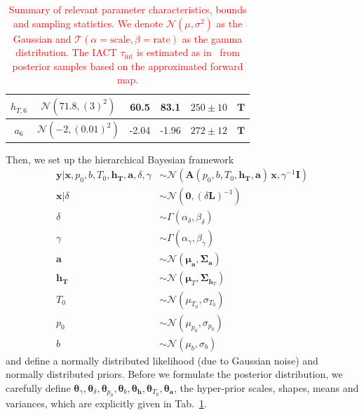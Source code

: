 \begin{table}
\begin{tabular}{ |c||c|c|c|c|c|   }
		$h_{T,6}$ &  $\mathcal{N}(71.8,(3)^2)$&60.5 &83.1&$250\pm 10$&$\bm{T}$\\ \hline
		$a_{6}$ & $\mathcal{N}(-2,(0.01)^2)$ &-2.04 &-1.96&$272\pm 12$&$\bm{T}$\\
		\hline
	\end{tabular}
	\caption[Summary of relevant parameter characteristics, bounds and sampling statistics.]{\textcolor{red}{Summary of relevant parameter characteristics, bounds and sampling statistics. We denote $\mathcal{N}(\mu,\sigma^2)$ as the Gaussian and $\mathcal{T}(\alpha = \text{scale}, \beta = \text{rate})$ as the gamma distribution. The IACT $\tau_{\text{int}}$ is estimated as in~\cite{UwerrM} from posterior samples based on the approximated forward map.}}
	\label{tab:priors}
\end{table}

Then, we set up the hierarchical Bayesian framework
\begin{subequations}
	\begin{align}
		\bm{y} |  \bm{x},p_0,b,T_0,\bm{h_T},\bm{a} ,\delta,\gamma  &\sim \mathcal{N}(\bm{A}(p_0,b,T_0,\bm{h_T},\bm{a}) \, \bm{x}, \gamma^{-1} \bm{I}) \label{eq:likelihoodFull} \\
		\bm{x}| \delta  &\sim \mathcal{N}(\bm{0}, (\delta \bm{L})^{-1} ) \label{eq:priorXFull} \\
		\delta  &\sim \Gamma(\alpha_{\delta} , \beta_{\delta} )\label{eq:priorDelFull} \\
		\gamma  &\sim \Gamma(\alpha_{\gamma}, \beta_{\gamma})\label{eq:priorGamFull} \\
		\bm{a}  &\sim \mathcal{N}(\bm{\mu}_{\bm{a}}, \bm{\Sigma}_{\bm{a}})\\
		\bm{h}_{\bm{T}}  &\sim \mathcal{N}(\bm{\mu}_{T}, \bm{\Sigma}_{\bm{h}_T}) \\
		T_0  &\sim \mathcal{N}(\mu_{T_0}, \sigma_{T_0} )\\
		p_0  &\sim \mathcal{N}(\mu_{p_0}, \sigma_{p_0} )\\
		b  &\sim \mathcal{N}(\mu_b, \sigma_b )
	\end{align}
	\label{eq:BayMode}
\end{subequations}
and define a normally distributed likelihood (due to Gaussian noise) and normally distributed priors.
Before we formulate the posterior distribution, we carefully define $\bm{\theta}_{\gamma}, \bm{\theta}_{\delta},\bm{\theta}_{p_0},\bm{\theta}_{b},\bm{\theta}_{\bm{h}},\bm{\theta}_{T_0},\bm{\theta}_{\bm{a}}$, the hyper-prior scales, shapes, means and variances, which are explicitly given in Tab.~\ref{tab:priors}.

